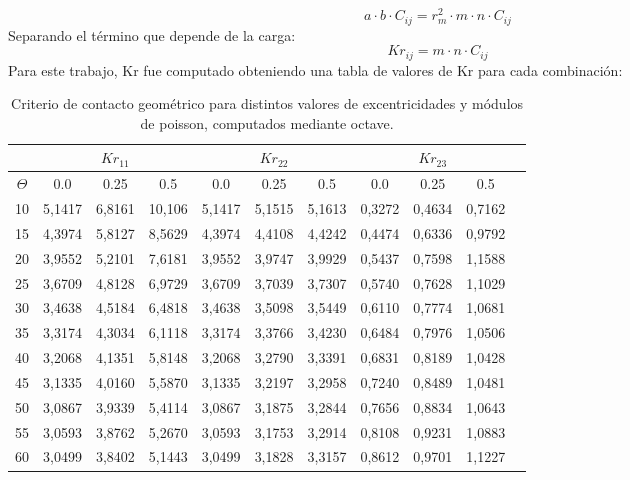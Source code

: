 \documentclass[main]{subfiles}
\begin{document}
\begin{equation}
a\cdot b \cdot C_{ij}=r_m^2 \cdot m \cdot n \cdot C_{ij}
\end{equation}
Separando el término que depende de la carga:
\begin{equation}
Kr_{ij}= m \cdot n \cdot C_{ij}
\end{equation}
\newline
Para este trabajo, Kr fue computado obteniendo una tabla de valores de Kr para cada combinación:
\newline
{
\begin{spacing}{1} 

\begin{table}[!htbp]
\caption{Criterio de contacto geométrico para distintos valores de excentricidades y módulos de poisson, computados mediante octave.}
\small
\begin{tabular}{|c|c|c|c|c|c|c|c|c|c|c|}\hline
& \multicolumn{3}{|c|}{$ Kr_{11}$} &\multicolumn{3}{|c|}{$ Kr_{22}$} & \multicolumn{3}{|c|}{$ Kr_{23}$}\\ \hline 
$\Theta$& 0.0 & 0.25 & 0.5 &0.0 & 0.25 & 0.5 & 0.0 & 0.25 & 0.5\\ \hline
10 & 5,1417 & 6,8161 & 10,106 & 5,1417 & 5,1515 & 5,1613 & 0,3272 & 0,4634 & 0,7162\\ \hline
15 & 4,3974 & 5,8127 & 8,5629 & 4,3974 & 4,4108 & 4,4242 & 0,4474 & 0,6336 & 0,9792\\ \hline
20 & 3,9552 & 5,2101 & 7,6181 & 3,9552 & 3,9747 & 3,9929 & 0,5437 & 0,7598 & 1,1588\\ \hline
25 & 3,6709 & 4,8128 & 6,9729 & 3,6709 & 3,7039 & 3,7307 & 0,5740 & 0,7628 & 1,1029\\ \hline
30 & 3,4638 & 4,5184 & 6,4818 & 3,4638 & 3,5098 & 3,5449 & 0,6110 & 0,7774 & 1,0681\\ \hline
35 & 3,3174 & 4,3034 & 6,1118 & 3,3174 & 3,3766 & 3,4230 & 0,6484 & 0,7976 & 1,0506\\ \hline
40 & 3,2068 & 4,1351 & 5,8148 & 3,2068 & 3,2790 & 3,3391 & 0,6831 & 0,8189 & 1,0428\\ \hline
45 & 3,1335 & 4,0160 & 5,5870 & 3,1335 & 3,2197 & 3,2958 & 0,7240 & 0,8489 & 1,0481\\ \hline
50 & 3,0867 & 3,9339 & 5,4114 & 3,0867 & 3,1875 & 3,2844 & 0,7656 & 0,8834 & 1,0643\\ \hline
55 & 3,0593 & 3,8762 & 5,2670 & 3,0593 & 3,1753 & 3,2914 & 0,8108 & 0,9231 & 1,0883\\ \hline
60 & 3,0499 & 3,8402 & 5,1443 & 3,0499 & 3,1828 & 3,3157 & 0,8612 & 0,9701 & 1,1227\\ \hline

\end{tabular}
\end{table}
\end{spacing}}
\end{document}
